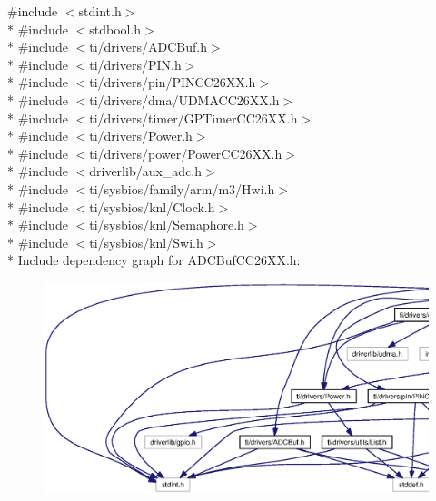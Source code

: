 {\ttfamily \#include $<$stdint.\+h$>$}\\*
{\ttfamily \#include $<$stdbool.\+h$>$}\\*
{\ttfamily \#include $<$ti/drivers/\+A\+D\+C\+Buf.\+h$>$}\\*
{\ttfamily \#include $<$ti/drivers/\+P\+I\+N.\+h$>$}\\*
{\ttfamily \#include $<$ti/drivers/pin/\+P\+I\+N\+C\+C26\+X\+X.\+h$>$}\\*
{\ttfamily \#include $<$ti/drivers/dma/\+U\+D\+M\+A\+C\+C26\+X\+X.\+h$>$}\\*
{\ttfamily \#include $<$ti/drivers/timer/\+G\+P\+Timer\+C\+C26\+X\+X.\+h$>$}\\*
{\ttfamily \#include $<$ti/drivers/\+Power.\+h$>$}\\*
{\ttfamily \#include $<$ti/drivers/power/\+Power\+C\+C26\+X\+X.\+h$>$}\\*
{\ttfamily \#include $<$driverlib/aux\+\_\+adc.\+h$>$}\\*
{\ttfamily \#include $<$ti/sysbios/family/arm/m3/\+Hwi.\+h$>$}\\*
{\ttfamily \#include $<$ti/sysbios/knl/\+Clock.\+h$>$}\\*
{\ttfamily \#include $<$ti/sysbios/knl/\+Semaphore.\+h$>$}\\*
{\ttfamily \#include $<$ti/sysbios/knl/\+Swi.\+h$>$}\\*
Include dependency graph for A\+D\+C\+Buf\+C\+C26\+X\+X.\+h\+:
\nopagebreak
\begin{figure}[H]
\begin{center}
\leavevmode
\includegraphics[width=350pt]{_a_d_c_buf_c_c26_x_x_8h__incl}
\end{center}
\end{figure}
